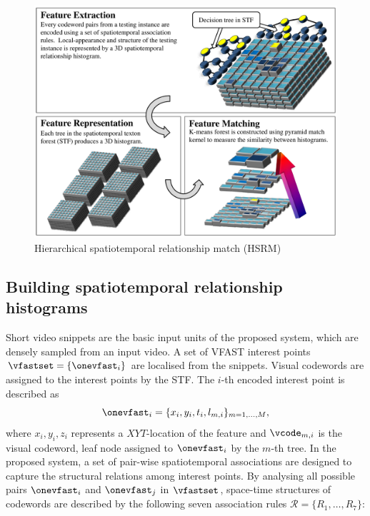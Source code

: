 \begin{figure}[ht]
	\centering	
	\includegraphics[width=0.9\linewidth]{fig/act/fig4_new.pdf} 
	\caption{Hierarchical spatiotemporal relationship match (HSRM)}
	\label{fig/act/hsrm}
\end{figure}

\subsection{Building spatiotemporal relationship histograms}

Short video snippets are the basic input units of the proposed system, which are densely sampled from an input video.  
A set of VFAST interest points $\vfastset = \{\onevfast_{i}\}$ are localised from the snippets. Visual codewords are assigned to the interest points by the STF.   
The $i$-th encoded interest point is described as 
\begin{equation}
	\onevfast_{i} = \{x_i, y_i, t_i, l_{m,i}\}_{m=1,\dots,M},
\end{equation}
where $x_i, y_i, z_i$ represents a $XYT$-location of the feature and $\vcode_{m,i}$ is the visual codeword, \ie leaf node assigned to $\onevfast_{i}$ by the $m$-th tree. 
In the proposed system, a set of pair-wise spatiotemporal associations are designed to capture the structural relations among interest points. By analysing all possible pairs $\onevfast_i$ and $\onevfast_j$ in $\vfastset$, space-time structures of codewords are described by the following seven association rules $\mathcal{R} = \{ R_1,\dots,R_7\}$:

